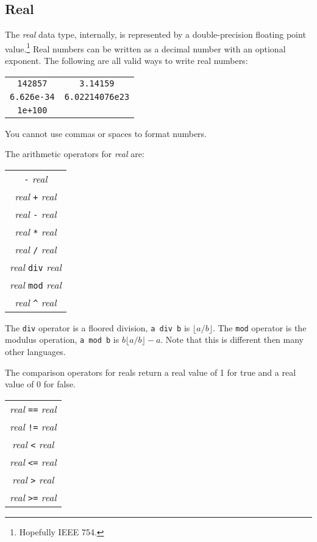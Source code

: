 \documentclass{article}
\begin{document}
\subsection{Real}
The \emph{real} data type, internally, is represented by a double-precision floating point value.\footnote{Hopefully IEEE 754.}
Real numbers can be written as a decimal number with an optional exponent.
The following are all valid ways to write real numbers:
\begin{center}
  \begin{tabular}{cc}
    \verb|142857| &  \verb|3.14159| \\
    \verb|6.626e-34| & \verb|6.02214076e23| \\
    \verb|1e+100| \\
  \end{tabular}
\end{center}
You cannot use commas or spaces to format numbers.

The arithmetic operators for \emph{real} are:
\begin{center}
  \begin{tabular}{c}
    \verb|-| \emph{real} \\
    \emph{real} \verb|+| \emph{real} \\
    \emph{real} \verb|-| \emph{real} \\
    \emph{real} \verb|*| \emph{real} \\
    \emph{real} \verb|/| \emph{real} \\
    \emph{real} \verb|div| \emph{real} \\
    \emph{real} \verb|mod| \emph{real} \\
    \emph{real} \verb|^| \emph{real} \\
  \end{tabular}
\end{center}
The \verb|div| operator is a floored division, \verb|a div b| is $\lfloor a/b \rfloor $.
The \verb|mod| operator is the modulus operation, \verb|a mod b| is $b\lfloor a/b\rfloor - a$.
Note that this is different then many other languages.

The comparison operators for reals return a real value of 1 for true and a real value of 0 for false.
\begin{center}
  \begin{tabular}{c}
    \emph{real} \verb|==| \emph{real} \\
    \emph{real} \verb|!=| \emph{real} \\
    \emph{real} \verb|<| \emph{real} \\
    \emph{real} \verb|<=| \emph{real} \\
    \emph{real} \verb|>| \emph{real} \\
    \emph{real} \verb|>=| \emph{real} \\
  \end{tabular}
\end{center}
\end{document}
